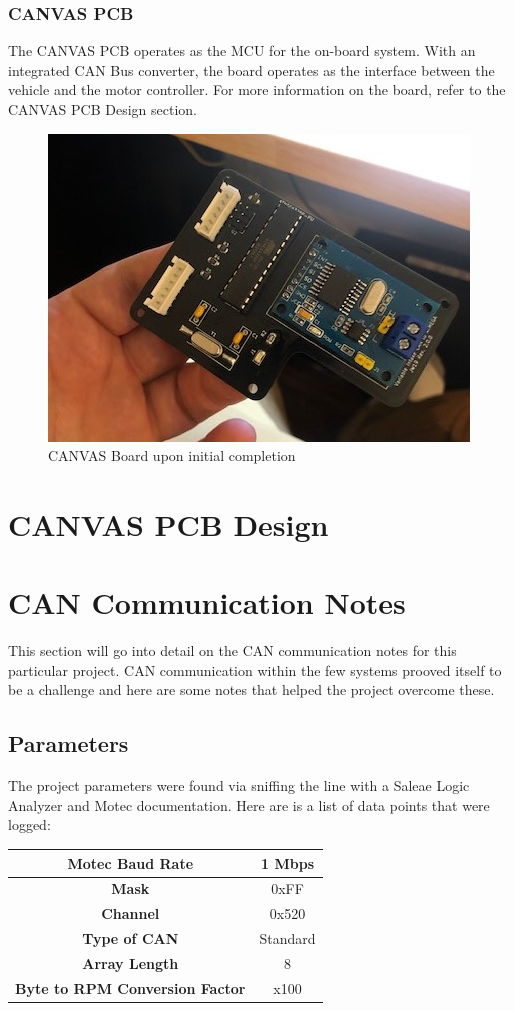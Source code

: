 \documentclass{article}
\begin{document}
\subsubsection{CANVAS PCB}
The CANVAS PCB operates as the MCU for the on-board system. With an integrated CAN Bus converter, the board operates as the interface between the vehicle and the motor controller. For more information on the board, refer to the CANVAS PCB Design section. 

\begin{figure}[h!]
\centering
\includegraphics[scale=0.5]{pcb_2.jpg}
\caption{CANVAS Board upon initial completion}
\label{fig:CANVAS_WorkBench}
\end{figure}

\section{CANVAS PCB Design}
\section{CAN Communication Notes}
This section will go into detail on the CAN communication notes for this particular project. CAN communication within the few systems prooved itself to be a challenge and here are some notes that helped the project overcome these.
\subsection{Parameters}
The project parameters were found via sniffing the line with a Saleae Logic Analyzer and Motec documentation. Here are is a list of data points that were logged:

\begin{center}
\begin{tabular}{ | c | c | }
\hline
 \textbf{Motec Baud Rate} & 1 Mbps \\ 
 \hline
 \textbf{Mask} & 0xFF \\ 
 \hline
 \textbf{Channel} & 0x520 \\    
 \hline
 \textbf{Type of CAN} & Standard \\
 \hline
 \textbf{Array Length} & 8 \\
 \hline
 \textbf{Byte to RPM Conversion Factor} & x100\\
 \hline
\end{tabular}
\end{center}
\end{document}
